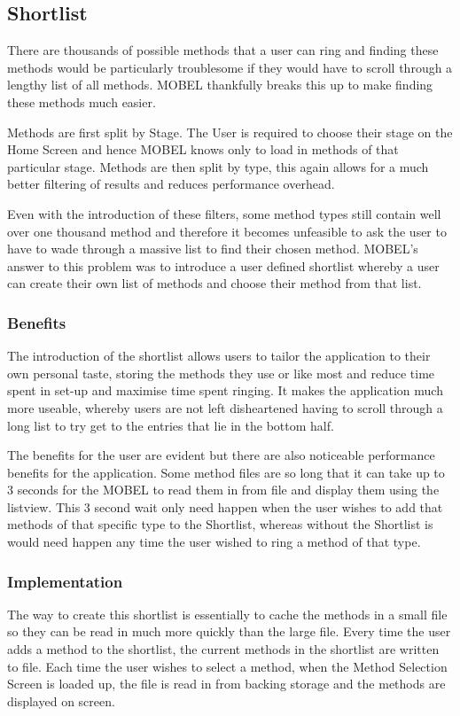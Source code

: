 \documentclass{l4proj}
\begin{document}
\subsection{Shortlist}
There are thousands of possible methods that a user can ring and finding these methods would be particularly troublesome if they would have to scroll through a lengthy list of all methods.  MOBEL thankfully breaks this up to make finding these methods much easier.  

Methods are first split by Stage.  The User is required to choose their stage on the Home Screen and hence MOBEL knows only to load in methods of that particular stage.  Methods are then split by type, this again allows for a much better filtering of results and reduces performance overhead.

Even with the introduction of these filters, some method types still contain well over one thousand method and therefore it becomes unfeasible to ask the user to have to wade through a massive list to find their chosen method. MOBEL's answer to this problem was to introduce a user defined shortlist whereby a user can create their own list of methods and choose their method from that list.  
\subsubsection{Benefits}

The introduction of the shortlist allows users to tailor the application to their own personal taste, storing the methods they use or like most and reduce time spent in set-up and maximise time spent ringing. It makes the application much more useable, whereby users are not left disheartened having to scroll through a long list to try get to the entries that lie in the bottom half.

The benefits for the user are evident but there are also noticeable performance benefits for the application.  Some method files are so long that it can take up to 3 seconds for the MOBEL to read them in from file and display them using the listview. This 3 second wait only need happen when the user wishes to add that methods of that specific type to the Shortlist, whereas without the Shortlist is would need happen any time the user wished to ring a method of that type. 

\subsubsection{Implementation}
The way to create this shortlist is essentially to cache the methods in a small file so they can be read in much more quickly than the large file. Every time the user adds a method to the shortlist, the current methods in the shortlist are written to file.  Each time the user wishes to select a method, when the Method Selection Screen is loaded up, the file is read in from backing storage and the methods are displayed on screen. 
\end{document}
